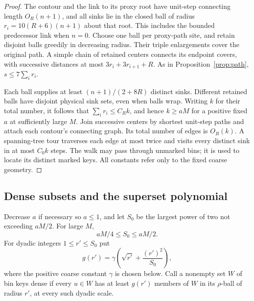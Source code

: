 \begin{proof}
The contour and the link to its proxy root have unit-step
connecting length \(O_R(n+1)\), and all sinks lie in the
closed ball of radius \(r_i=10(R+6)(n+1)\) about that root.
This includes the bounded predecessor link when \(n=0\).
Choose one ball per proxy-path site, and retain disjoint
balls greedily in decreasing radius.
Their triple enlargements cover the original path.
A simple chain of retained centers connects its endpoint
covers, with successive distances at most
\(3r_i+3r_{i+1}+R\).
As in Proposition~\ref{prop:path},
\(s\le7\sum_i r_i\).

Each ball supplies at least
\((n+1)/(2+8R)\) distinct sinks. Different retained balls
have disjoint physical sink sets, even when balls wrap.
Writing \(k\) for their total number, it follows that
\(\sum_i r_i\le C_Rk\), and hence \(k\ge aM\) for a
positive fixed \(a\) at sufficiently large \(M\).
Join successive centers by shortest unit-step paths and
attach each contour's connecting graph.
Its total number of edges is \(O_R(k)\).
A spanning-tree tour traverses each edge at most twice
and visits every distinct sink in at most \(C_0k\) steps.
The walk may pass through unmarked bins; it is used to
locate its distinct marked keys.
All constants refer only to the fixed coarse geometry.
\end{proof}

\subsection{Dense subsets and the superset polynomial}

Decrease \(a\) if necessary so \(a\le1\), and let \(S_0\) be the
largest power of two not exceeding \(aM/2\).
For large \(M\),
\[
 aM/4\le S_0\le aM/2.
\]
For dyadic integers \(1\le r'\le S_0\) put
\begin{equation}\label{eq:density-function}
 g(r')=\gamma\left(\sqrt{r'}+\frac{(r')^2}{S_0}\right),
\end{equation}
where the positive coarse constant \(\gamma\) is chosen below.
Call a nonempty set \(W\) of bin keys dense if every \(u\in W\)
has at least \(g(r')\) members of \(W\) in its
\(\rho\)-ball of radius \(r'\), at every such dyadic scale.

